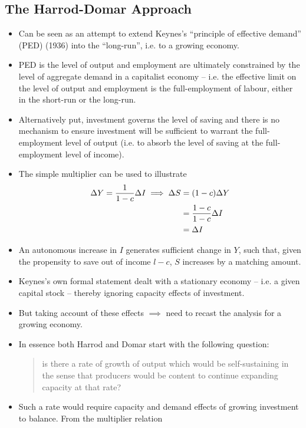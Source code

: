 \documentclass[a4paper,twoside]{article}
\newcommand{\myuline}[1]{%
	\uline{\phantom{#1}}%
	\llap{\contour{white}{#1}}%
}
\numberwithin{equation}{section}
\numberwithin{figure}{section}
\begin{document}
\subsection{The Harrod-Domar Approach}
	\begin{itemize}
		\item Can be seen as an attempt to extend Keynes's ``principle of effective demand'' (PED) (1936) into the ``long-run'', i.e. to a growing economy. 
		\item PED is the level of output and employment are ultimately constrained by the level of aggregate demand in a capitalist economy -- i.e. the effective limit on the level of output and employment is \textbf{\myuline{not}} the full-employment of labour, either in the short-run or the long-run.
		\item Alternatively put, investment governs the level of saving and there is no mechanism to ensure investment will be sufficient to warrant the full-employment level of output (i.e. to absorb the level of saving at the full-employment level of income).
		\item The simple multiplier can be used to illustrate
		\begin{align}
			\Delta Y = \frac{1}{1-c} \Delta I \implies \Delta S &= (1-c) \Delta Y\\ \notag
																&= \frac{1-c}{1-c} \Delta I\\ \notag
																&= \Delta I \label{eq:2.3}
		\end{align}
		\item An autonomous increase in \( I \) generates sufficient change in \( Y \), such that, given the propensity to save out of income \( l-c \), \( S \) increases by a matching amount. 
		\item Keynes's own formal statement dealt with a stationary economy -- i.e. a given capital stock -- thereby ignoring capacity effects of investment. 
		\item But taking account of these effects \( \implies \) need to recast the analysis for a growing economy.
		\item In essence both Harrod and Domar start with the following question: 
		\begin{quote}
			is there a rate of growth of output which would be self-sustaining in the sense that producers would be content to continue expanding capacity at that rate?
		\end{quote}
		\item Such a rate would require capacity and demand effects of growing investment to balance. From the multiplier relation

\end{itemize}
\end{document}
